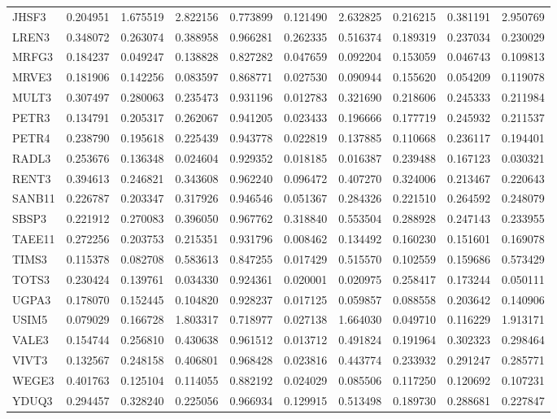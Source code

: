 \begin{tabular}{lrrrrrrrrr}
JHSF3 & 0.204951 & 1.675519 & 2.822156 & 0.773899 & 0.121490 & 2.632825 & 0.216215 & 0.381191 & 2.950769 \\
LREN3 & 0.348072 & 0.263074 & 0.388958 & 0.966281 & 0.262335 & 0.516374 & 0.189319 & 0.237034 & 0.230029 \\
MRFG3 & 0.184237 & 0.049247 & 0.138828 & 0.827282 & 0.047659 & 0.092204 & 0.153059 & 0.046743 & 0.109813 \\
MRVE3 & 0.181906 & 0.142256 & 0.083597 & 0.868771 & 0.027530 & 0.090944 & 0.155620 & 0.054209 & 0.119078 \\
MULT3 & 0.307497 & 0.280063 & 0.235473 & 0.931196 & 0.012783 & 0.321690 & 0.218606 & 0.245333 & 0.211984 \\
PETR3 & 0.134791 & 0.205317 & 0.262067 & 0.941205 & 0.023433 & 0.196666 & 0.177719 & 0.245932 & 0.211537 \\
PETR4 & 0.238790 & 0.195618 & 0.225439 & 0.943778 & 0.022819 & 0.137885 & 0.110668 & 0.236117 & 0.194401 \\
RADL3 & 0.253676 & 0.136348 & 0.024604 & 0.929352 & 0.018185 & 0.016387 & 0.239488 & 0.167123 & 0.030321 \\
RENT3 & 0.394613 & 0.246821 & 0.343608 & 0.962240 & 0.096472 & 0.407270 & 0.324006 & 0.213467 & 0.220643 \\
SANB11 & 0.226787 & 0.203347 & 0.317926 & 0.946546 & 0.051367 & 0.284326 & 0.221510 & 0.264592 & 0.248079 \\
SBSP3 & 0.221912 & 0.270083 & 0.396050 & 0.967762 & 0.318840 & 0.553504 & 0.288928 & 0.247143 & 0.233955 \\
TAEE11 & 0.272256 & 0.203753 & 0.215351 & 0.931796 & 0.008462 & 0.134492 & 0.160230 & 0.151601 & 0.169078 \\
TIMS3 & 0.115378 & 0.082708 & 0.583613 & 0.847255 & 0.017429 & 0.515570 & 0.102559 & 0.159686 & 0.573429 \\
TOTS3 & 0.230424 & 0.139761 & 0.034330 & 0.924361 & 0.020001 & 0.020975 & 0.258417 & 0.173244 & 0.050111 \\
UGPA3 & 0.178070 & 0.152445 & 0.104820 & 0.928237 & 0.017125 & 0.059857 & 0.088558 & 0.203642 & 0.140906 \\
USIM5 & 0.079029 & 0.166728 & 1.803317 & 0.718977 & 0.027138 & 1.664030 & 0.049710 & 0.116229 & 1.913171 \\
VALE3 & 0.154744 & 0.256810 & 0.430638 & 0.961512 & 0.013712 & 0.491824 & 0.191964 & 0.302323 & 0.298464 \\
VIVT3 & 0.132567 & 0.248158 & 0.406801 & 0.968428 & 0.023816 & 0.443774 & 0.233932 & 0.291247 & 0.285771 \\
WEGE3 & 0.401763 & 0.125104 & 0.114055 & 0.882192 & 0.024029 & 0.085506 & 0.117250 & 0.120692 & 0.107231 \\
YDUQ3 & 0.294457 & 0.328240 & 0.225056 & 0.966934 & 0.129915 & 0.513498 & 0.189730 & 0.288681 & 0.227847 \\
\bottomrule
\end{tabular}
